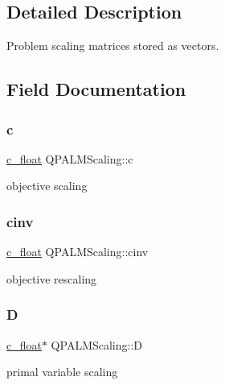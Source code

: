 \subsection{Detailed Description}
Problem scaling matrices stored as vectors. 

\subsection{Field Documentation}
\mbox{\label{structQPALMScaling_a4f98c16d0423437efedba58fcf266114}} 
\subsubsection{\texorpdfstring{c}{c}}
{\footnotesize\ttfamily \mbox{\hyperlink{global__opts_8h_a7f1a9fda95e52979658c20a0d134fb15}{c\+\_\+float}} Q\+P\+A\+L\+M\+Scaling\+::c}



objective scaling 

\mbox{\label{structQPALMScaling_aaea7f6c4b7a75e588c98f37f3f20a0d7}} 
\subsubsection{\texorpdfstring{cinv}{cinv}}
{\footnotesize\ttfamily \mbox{\hyperlink{global__opts_8h_a7f1a9fda95e52979658c20a0d134fb15}{c\+\_\+float}} Q\+P\+A\+L\+M\+Scaling\+::cinv}



objective rescaling 

\mbox{\label{structQPALMScaling_ad1acc3ea936bca94d4a166dee8c92bd9}} 
\subsubsection{\texorpdfstring{D}{D}}
{\footnotesize\ttfamily \mbox{\hyperlink{global__opts_8h_a7f1a9fda95e52979658c20a0d134fb15}{c\+\_\+float}}$\ast$ Q\+P\+A\+L\+M\+Scaling\+::D}



primal variable scaling 

\mbox{\label{structQPALMScaling_a1811ba868f52b35ae61afe4850c7068a}} 
